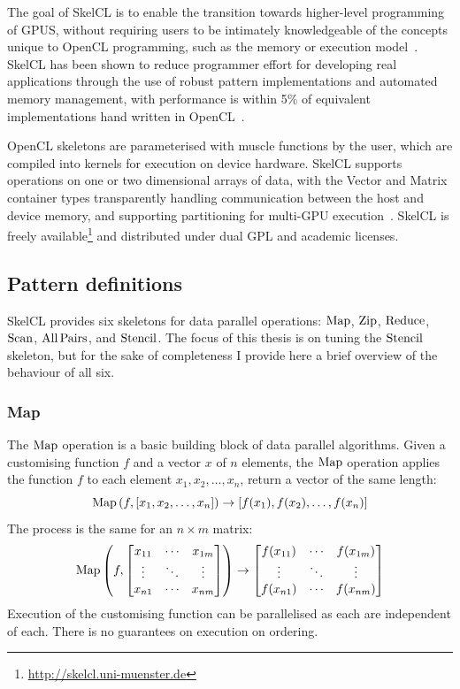 The goal of SkelCL is to enable the transition towards higher-level
programming of GPUS, without requiring users to be intimately
knowledgeable of the concepts unique to OpenCL programming, such as
the memory or execution model~\cite{Steuwer2012}. SkelCL has been
shown to reduce programmer effort for developing real applications
through the use of robust pattern implementations and automated memory
management, with performance is within 5\% of equivalent
implementations hand written in OpenCL~\cite{Steuwer2013}.

OpenCL skeletons are parameterised with muscle functions by the user,
which are compiled into kernels for execution on device
hardware. SkelCL supports operations on one or two dimensional arrays
of data, with the Vector and Matrix container types transparently
handling communication between the host and device memory, and
supporting partitioning for multi-GPU
execution~\cite{Steuwer2013a}. SkelCL is freely
available\footnote{\url{http://skelcl.uni-muenster.de}} and
distributed under dual GPL and academic licenses.


\subsection{Pattern definitions}

SkelCL provides six skeletons for data parallel operations: $\operatorname*{Map}$,
$\operatorname*{Zip}$, $\operatorname*{Reduce}$, $\operatorname*{Scan}$, $\operatorname*{All\,Pairs}$, and $\operatorname*{Stencil}$. The focus of
this thesis is on tuning the $\operatorname*{Stencil}$ skeleton, but for the sake of
completeness I provide here a brief overview of the behaviour of all
six.


\subsubsection{Map}

The $\operatorname*{Map}$ operation is a basic building block of data parallel
algorithms. Given a customising function $f$ and a vector $x$ of $n$
elements, the $\operatorname*{Map}$ operation applies the function $f$ to each
element $x_1, x_2, \ldots, x_n$, return a vector of the same length:
%
\begin{equation}
\operatorname*{Map}\left(f, [x_1,x_2,\ldots,x_n]\right) \to [f(x_1),f(x_2),\ldots,f(x_n)]
\end{equation}
%
The process is the same for an $n \times m$ matrix:
%
\begin{equation}
\operatorname*{Map}\left(f,
\begin{bmatrix}
  x_{11} & \cdots & x_{1m} \\
  \vdots & \ddots & \vdots \\
  x_{n1} & \cdots & x_{nm}
\end{bmatrix}\right)
\to
\begin{bmatrix}
  f(x_{11}) & \cdots & f(x_{1m}) \\
  \vdots & \ddots & \vdots \\
  f(x_{n1}) & \cdots & f(x_{nm})
\end{bmatrix}
\end{equation}
%
Execution of the customising function can be parallelised as each are
independent of each. There is no guarantees on execution on ordering.


